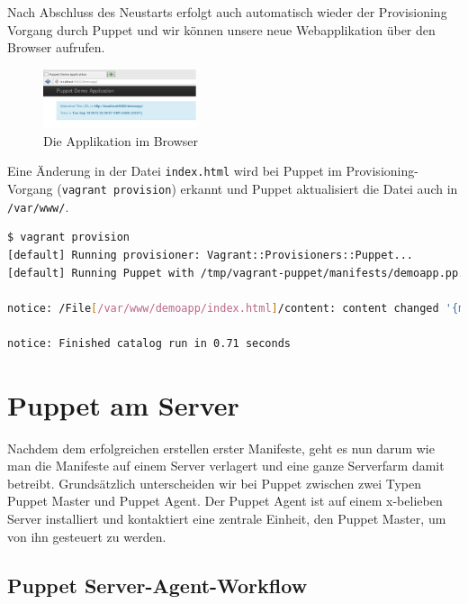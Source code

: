 \documentclass[12pt,a4paper,ngerman]{article}
\begin{document}
Nach Abschluss des Neustarts erfolgt auch automatisch wieder der Provisioning Vorgang durch Puppet und wir können unsere neue Webapplikation über den Browser aufrufen.
\begin{figure}
  \begin{center}
    \includegraphics[width=0.4\textwidth]{images/demoapp.pdf}
  \end{center}
  \caption{Die Applikation im Browser}
  \label{demoapp}
\end{figure}

Eine Änderung in der Datei \lstinline$index.html$ wird bei Puppet im Provisioning-Vorgang (\lstinline$vagrant provision$) erkannt und Puppet aktualisiert die Datei auch in \lstinline$/var/www/$.
\begin{lstlisting}[language=sh,caption=Puppet Provisioning nach Änderung von index.html, label=provisionapp]
$ vagrant provision
[default] Running provisioner: Vagrant::Provisioners::Puppet...
[default] Running Puppet with /tmp/vagrant-puppet/manifests/demoapp.pp...

notice: /File[/var/www/demoapp/index.html]/content: content changed '{md5}90a8d419b9c7b43b09ba73abebaf8f4c' to '{md5}0a4ee5bb63c3e5c29cc54cf36a4be23c'

notice: Finished catalog run in 0.71 seconds
\end{lstlisting}

\section{Puppet am Server}

Nachdem dem erfolgreichen erstellen erster Manifeste, geht es nun darum wie man die Manifeste auf einem Server verlagert und eine ganze Serverfarm damit betreibt. Grundsätzlich unterscheiden wir bei Puppet zwischen zwei Typen Puppet Master und Puppet Agent. Der Puppet Agent ist auf einem x-belieben Server installiert und kontaktiert eine zentrale Einheit, den Puppet Master, um von ihn gesteuert zu werden. 

\subsection{Puppet Server-Agent-Workflow}
\end{document}
